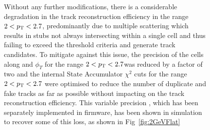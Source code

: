 \begin{figure}[tb]
Without any further modifications, there is a considerable degradation in the track reconstruction efficiency in the range $2 < p_{\mathrm{T}} < 2.7$\GeVc, predominantly due to multiple scattering which results in stubs not always intersecting within a single \HT cell and thus failing to exceed the threshold criteria and generate track candidates.
To mitigate against this issue, the precision of the \HT cells along \qpt and $\phi_{T}$ for the range $2 < p_{\mathrm{T}} < 2.7$\GeVc was reduced by a factor of two and the internal \KF State Accumulator $\chi^2$ cuts for the range $2 < p_{\mathrm{T}} < 2.7$ were optimised to reduce the number of duplicate and fake tracks as far as possible without impacting on the track reconstruction efficiency.
This variable precision \HT, which has been separately implemented in firmware, has been shown in simulation to recover some of this loss, as shown in Fig~\ref{fig:2GeVFlat}


\end{figure}
